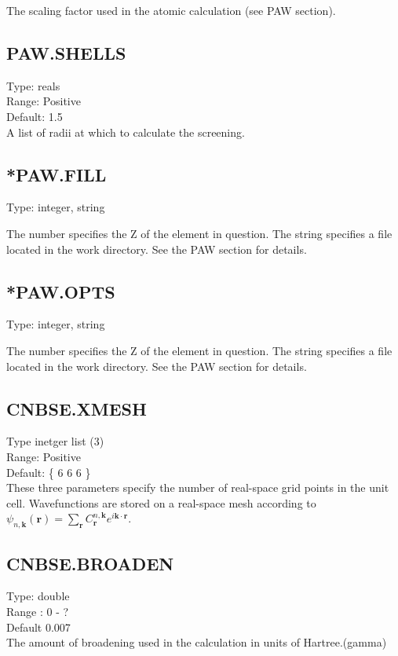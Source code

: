 \documentclass[12pt]{article}
\begin{document}
The scaling factor used in the atomic calculation (see PAW section).

\subsection{PAW.SHELLS}
Type: reals \\
Range: Positive \\
Default: 1.5 \\

A list of radii at which to calculate the screening. 

\subsection{*PAW.FILL}
Type: integer, string

The number specifies the Z of the element in question. The string specifies a file located in the 
work directory. See the PAW section for details.

\subsection{*PAW.OPTS}
Type: integer, string

The number specifies the Z of the element in question. The string specifies a file located in the      
work directory. See the PAW section for details.


\subsection{CNBSE.XMESH}
Type inetger list (3) \\
Range: Positive \\
Default: \{ 6 6 6 \} \\

These three parameters specify the number of real-space grid points 
in the unit cell. Wavefunctions are stored on a real-space mesh according to 
$\psi_{n,\mathbf{k}}(\mathbf{r}) = \sum_{\mathbf{r}}C^{n,\mathbf{k}}_{\mathbf{r}} e^{i \mathbf{k} \cdot \mathbf{r}}$. 

\subsection{CNBSE.BROADEN}
Type: double \\
Range : 0 - ? \\
Default 0.007 \\

The amount of broadening used in the calculation in units of Hartree.(gamma)
\end{document}
